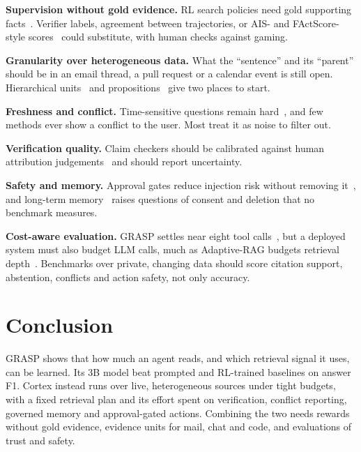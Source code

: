 \documentclass[conference]{IEEEtran}
\begin{document}
\textbf{Supervision without gold evidence.} RL search policies need gold supporting facts~\cite{gandhi2026grasp,luo2025maragr1}. Verifier labels, agreement between trajectories, or AIS- and FActScore-style scores~\cite{rashkin2023ais,min2023factscore} could substitute, with human checks against gaming.

\textbf{Granularity over heterogeneous data.} What the ``sentence'' and its ``parent'' should be in an email thread, a pull request or a calendar event is still open. Hierarchical units~\cite{sarthi2024raptor,du2026arag} and propositions~\cite{chen2024densex} give two places to start.

\textbf{Freshness and conflict.} Time-sensitive questions remain hard~\cite{vu2024freshllms}, and few methods ever show a conflict to the user. Most treat it as noise to filter out.

\textbf{Verification quality.} Claim checkers should be calibrated against human attribution judgements~\cite{rashkin2023ais,gao2023alce} and should report uncertainty.

\textbf{Safety and memory.} Approval gates reduce injection risk without removing it~\cite{greshake2023injection,hou2025mcp}, and long-term memory~\cite{packer2023memgpt,park2023generative,chhikara2025mem0} raises questions of consent and deletion that no benchmark measures.

\textbf{Cost-aware evaluation.} GRASP settles near eight tool calls~\cite{gandhi2026grasp}, but a deployed system must also budget LLM calls, much as Adaptive-RAG budgets retrieval depth~\cite{jeong2024adaptiverag}. Benchmarks over private, changing data should score citation support, abstention, conflicts and action safety, not only accuracy.

\section{Conclusion}

GRASP shows that how much an agent reads, and which retrieval signal it uses, can be learned. Its 3B model beat prompted and RL-trained baselines on answer F1. Cortex instead runs over live, heterogeneous sources under tight budgets, with a fixed retrieval plan and its effort spent on verification, conflict reporting, governed memory and approval-gated actions. Combining the two needs rewards without gold evidence, evidence units for mail, chat and code, and evaluations of trust and safety.



\end{document}
